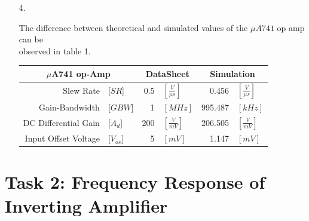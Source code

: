 \documentclass[11pt,a4paper]{article}
\begin{document}
\begin{enumerate}
    \pagebreak
 \item[4.]
 

The difference between theoretical and simulated values of the $\mu A741$ op amp can be \\observed in table 1.\\

\begin{minipage}{\linewidth}

\begin{center}
  \begin{tabular}{r l r l r l}
	\multicolumn{2}{c}{$\mu$A741 op-Amp} &   
  \multicolumn{2}{c}{DataSheet} &
  \multicolumn{2}{c}{Simulation}\\
  \hline
  \vspace{0.2em}
  Slew Rate & [$SR$] & 0.5 & $ [\frac{V}{\mu s}]$ & 0.456& $      [\frac{V}{\mu s}]$ \\
  	\vspace{0.2em}
  Gain-Bandwidth & [$GBW$]& 1 &$ [MHz]$  & 995.487 &$ [kHz]$ \\
  	\vspace{0.2em}
  DC Differential Gain &[$A_{d}$] & 200& $[\frac{V}{mV}]$ & 206.505& $[\frac{V}{mV}]$ \\
  	\vspace{0.2em}
  Input Offset Voltage &[$V_{os}$] & 5& $[mV]$& 1.147& $[mV]$ \\
    \end{tabular}
\end{center}
\end{minipage}
\end{enumerate}

\section*{Task 2: Frequency Response of Inverting Amplifier}
\end{document}
